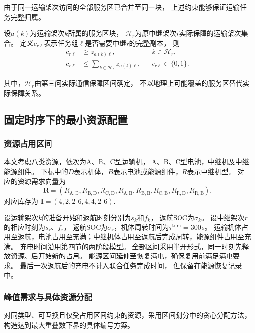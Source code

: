 \documentclass[bwprint]{gmcmthesis}
\begin{document}
由于同一运输架次访问的全部服务区已合并至同一块，
上述约束能够保证运输任务完整归属。

设$a(k)$为运输架次$k$所属的服务区块，
$\mathcal{H}_r$为原中继架次$r$实际保障的运输架次集合。
定义$c_{r\ell}$表示任务组$\ell$是否需要中继$r$的完整副本，
则
\begin{align}
c_{r\ell}&\geq z_{a(k)\ell},
&& k\in\mathcal{H}_r,\\
c_{r\ell}&\leq
\sum_{k\in\mathcal{H}_r}z_{a(k)\ell},
&& c_{r\ell}\in\{0,1\}.
\end{align}

其中，$\mathcal{H}_r$由第三问实际通信保障区间确定，
不以地理上可能覆盖的服务区替代实际保障关系。

\subsection{固定时序下的最小资源配置}

\subsubsection{资源占用区间}

本文考虑八类资源，依次为A、B、C型运输机，
A、B、C型电池，中继机及中继能源组件。
下标中的$D$表示机体，$B$表示电池或能源组件，$R$表示中继机型。
对应的资源需求向量为
\begin{equation}
\boldsymbol{R}=
\left(
R_{\mathrm{A,D}},R_{\mathrm{B,D}},R_{\mathrm{C,D}},
R_{\mathrm{A,B}},R_{\mathrm{B,B}},R_{\mathrm{C,B}},
R_{\mathrm{R,D}},R_{\mathrm{R,B}}
\right).
\end{equation}
对应库存为
\(\boldsymbol{I}=(4,2,2,6,4,4,2,6)\).

设运输架次$k$的准备开始和返航时刻分别为$s_k$和$f_k$，
返航SOC为$\sigma_k$。
设中继架次$r$的相应时刻为$s_r$、$f_r$，
返航SOC为$\sigma_r$，机体周转时间为$\tau^{\mathrm{turn}}=300\,\mathrm{s}$。
运输机体占用至返航，电池占用至充满；中继机体占用至返航后完成周转，能源组件占用至充满。
充电时间沿用第四节的两阶段模型。
全部区间采用半开形式，同一时刻先释放资源、后开始新的占用。
能源区间延伸至恢复满电，确保复用前满足满电要求。
最后一次返航后的充电不计入联合任务完成时间，
但保留在能源恢复记录中。

\subsubsection{峰值需求与具体资源分配}
对同类型、可互换且仅受占用区间约束的资源，采用区间划分中的贪心分配方法\cite{kleinberg2006}，构造达到最大重叠数下界的具体编号方案。
\end{document}
